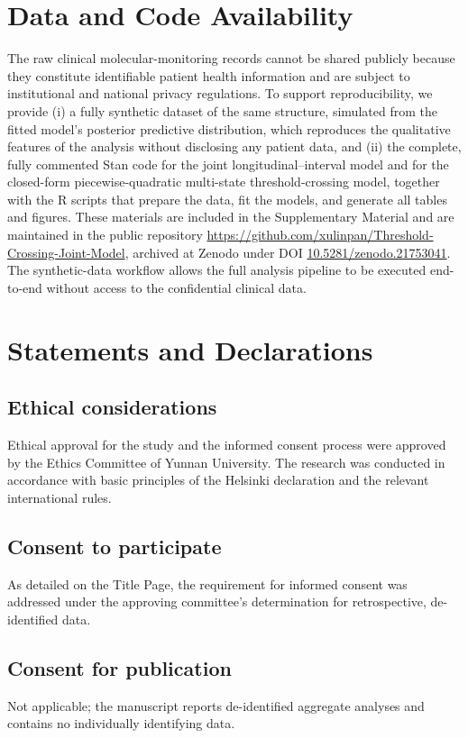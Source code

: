 \documentclass[11pt]{article}
\begin{document}
\section*{Data and Code Availability}

The raw clinical molecular-monitoring records cannot be shared publicly because
they constitute identifiable patient health information and are subject to
institutional and national privacy regulations. To support reproducibility, we
provide (i) a fully synthetic dataset of the same structure, simulated from the
fitted model's posterior predictive distribution, which reproduces the
qualitative features of the analysis without disclosing any patient data, and
(ii) the complete, fully commented Stan code for the joint
longitudinal--interval model and for the closed-form piecewise-quadratic
multi-state threshold-crossing model, together with the R scripts that prepare
the data, fit the models, and generate all tables and figures. These materials
are included in the Supplementary Material and are maintained in the public
repository \url{https://github.com/xulinpan/Threshold-Crossing-Joint-Model},
archived at Zenodo under DOI \href{https://doi.org/10.5281/zenodo.21753041}{10.5281/zenodo.21753041}.
The synthetic-data workflow allows the full analysis pipeline to be
executed end-to-end without access to the confidential clinical data.

\section*{Statements and Declarations}

\subsection*{Ethical considerations}
Ethical approval for the study and the informed consent process were approved by the Ethics Committee of Yunnan
University. The research was conducted in accordance with basic principles of the Helsinki declaration and the
relevant international rules.

\subsection*{Consent to participate}
As detailed on the Title Page, the requirement for informed consent was
addressed under the approving committee's determination for retrospective,
de-identified data.

\subsection*{Consent for publication}
Not applicable; the manuscript reports de-identified aggregate analyses and
contains no individually identifying data.
\end{document}
